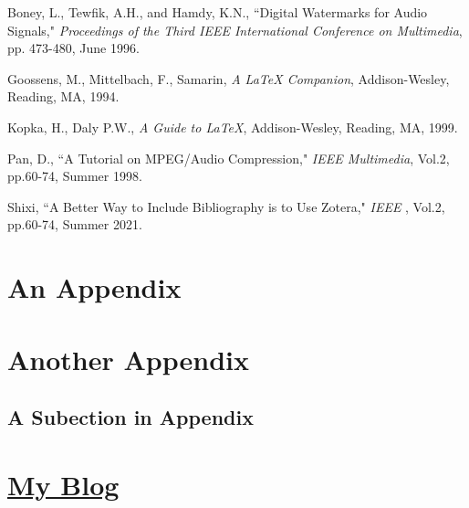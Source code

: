 \documentclass[11pt]{book}
\newcommand\myBlogUrl{http://schenax.student.ust.hk}
\begin{document}
%

\begin{thebibliography}{100}
	
	 Boney, L., Tewfik, A.H., and Hamdy, K.N., ``Digital
	Watermarks for Audio Signals," \emph{Proceedings of the Third IEEE
		International Conference on Multimedia}, pp. 473-480, June 1996.
	
	 Goossens, M., Mittelbach, F., Samarin, \emph{A LaTeX
		Companion}, Addison-Wesley, Reading, MA, 1994.
	
	 Kopka, H., Daly P.W., \emph{A Guide to LaTeX},
	Addison-Wesley, Reading, MA, 1999.
	
	 Pan, D., ``A Tutorial on MPEG/Audio Compression," \emph{IEEE
		Multimedia}, Vol.2, pp.60-74, Summer 1998.
	
	 Shixi, ``A Better Way to Include Bibliography is to Use Zotera," \emph{IEEE
		}, Vol.2, pp.60-74, Summer 2021.
	
\end{thebibliography}

\begin{appendices}
	\chapter{An Appendix}
	
	
	
	
	\chapter{Another Appendix}
	
	\section{A Subection in Appendix}
	
	\chapter{\href{\myBlogUrl}{\noindent My Blog \texorpdfstring{\small {}}{}}}
	
\end{appendices}
\end{document}
